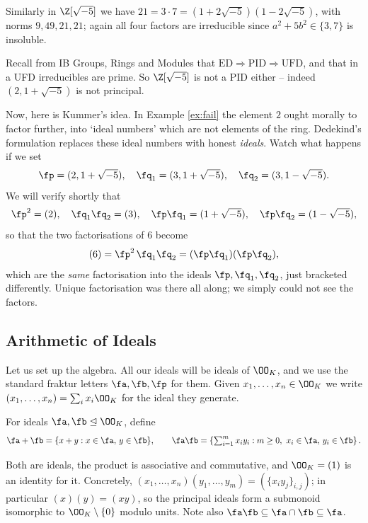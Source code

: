 \begin{example}\label{ex:fail2}
	Similarly in $\Z[\sqrt{-5}]$ we have $21 = 3 \cdot 7 = (1+2\sqrt{-5})(1-2\sqrt{-5})$, with norms $9, 49, 21, 21$; again all four factors are irreducible since $a^2+5b^2 \in \{3,7\}$ is insoluble.
\end{example}

Recall from IB Groups, Rings and Modules that $\text{ED} \Rightarrow \text{PID} \Rightarrow \text{UFD}$, and that in a UFD irreducibles are prime. So $\Z[\sqrt{-5}]$ is not a PID either -- indeed $(2, 1+\sqrt{-5})$ is not principal.

Now, here is Kummer's idea. In Example \ref{ex:fail} the element $2$ ought morally to factor further, into `ideal numbers' which are not elements of the ring. Dedekind's formulation replaces these ideal numbers with honest \emph{ideals}. Watch what happens if we set
$$\fp = (2, 1+\sqrt{-5}), \quad \fq_1 = (3, 1+\sqrt{-5}), \quad \fq_2 = (3, 1-\sqrt{-5}).$$
We will verify shortly that
$$\fp^2 = (2), \quad \fq_1\fq_2 = (3), \quad \fp\fq_1 = (1+\sqrt{-5}), \quad \fp\fq_2 = (1-\sqrt{-5}),$$
so that the two factorisations of $6$ become
$$(6) = \fp^2\,\fq_1\fq_2 = (\fp\fq_1)(\fp\fq_2),$$
which are the \emph{same} factorisation into the ideals $\fp, \fq_1, \fq_2$, just bracketed differently. Unique factorisation was there all along; we simply could not see the factors.

\subsection{Arithmetic of Ideals}

Let us set up the algebra. All our ideals will be ideals of $\OO_K$, and we use the standard fraktur letters $\fa, \fb, \fp$ for them. Given $x_1, \dots, x_n \in \OO_K$ we write $(x_1, \dots, x_n) = \sum_i x_i \OO_K$ for the ideal they generate.

\begin{definition}
	For ideals $\fa, \fb \trianglelefteq \OO_K$, define
	$$\fa + \fb = \{x + y : x \in \fa,\, y \in \fb\}, \qquad \fa\fb = \left\{\textstyle\sum_{i=1}^m x_iy_i : m \geq 0,\ x_i \in \fa,\, y_i \in \fb\right\}.$$
\end{definition}

Both are ideals, the product is associative and commutative, and $\OO_K = (1)$ is an identity for it. Concretely, $(x_1,\dots,x_n)(y_1,\dots,y_m) = (\{x_iy_j\}_{i,j})$; in particular $(x)(y) = (xy)$, so the principal ideals form a submonoid isomorphic to $\OO_K \setminus\{0\}$ modulo units. Note also $\fa\fb \subseteq \fa \cap \fb \subseteq \fa$.


